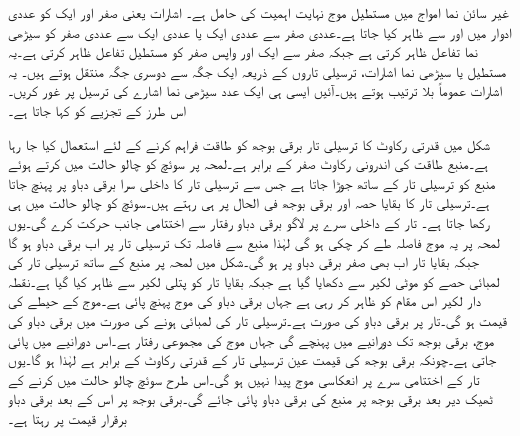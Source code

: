 غیر سائن نما امواج میں مستطیل موج نہایت اہمیت کی حامل ہے۔ اشارات یعنی صفر اور  ایک  کو عددی ادوار  میں  اور  سے ظاہر کیا جاتا ہے۔عددی صفر سے عددی ایک یا عددی ایک سے عددی صفر کو سیڑھی نما تفاعل ظاہر کرتی ہے جبکہ صفر سے ایک اور واپس صفر کو مستطیل تفاعل ظاہر کرتی ہے۔یہ مستطیل یا سیڑھی نما اشارات، ترسیلی تاروں کے ذریعہ ایک جگہ سے دوسری جگہ منتقل ہوتے ہیں۔ یہ اشارات عموماً بلا ترتیب ہوتے ہیں۔آئیں ایسی ہی ایک عدد سیڑھی نما اشارے کی ترسیل پر غور کریں۔ اس طرز کے تجزیے کو  کہا جاتا ہے۔

 شکل  میں  قدرتی رکاوٹ کا ترسیلی تار  برقی بوجھ کو طاقت فراہم کرنے کے لئے استعمال کیا جا رہا ہے۔منبع طاقت کی اندرونی رکاوٹ صفر کے برابر ہے۔لمحہ  پر سوئچ کو چالو حالت میں کرتے ہوئے منبع کو ترسیلی تار کے ساتھ جوڑا جاتا ہے جس سے ترسیلی تار کا داخلی سرا  برقی دباو پر پہنچ جاتا ہے۔ترسیلی تار کا بقایا حصہ اور برقی بوجھ فی الحال  پر ہی رہتے ہیں۔سوئچ کو چالو حالت میں ہی رکھا جاتا ہے۔ تار کے داخلی سرے پر لاگو برقی دباو رفتار  سے اختتامی جانب حرکت کرے گی۔یوں لمحہ  پر یہ موج  فاصلہ طے کر چکی ہو گی لہٰذا منبع سے فاصلہ  تک ترسیلی تار پر اب برقی دباو  ہو گا جبکہ بقایا تار اب بھی صفر برقی دباو پر ہو گی۔شکل  میں لمحہ  پر منبع کے ساتھ ترسیلی تار کی  لمبائی حصے کو موٹی لکیر سے دکھایا گیا ہے جبکہ بقایا تار کو پتلی لکیر سے ظاہر کیا گیا ہے۔نقطہ دار لکیر اس مقام کو ظاہر کر رہی ہے جہاں برقی دباو کی موج   پہنچ پائی ہے۔موج کے حیطے کی قیمت   ہو گی۔تار پر برقی دباو کی صورت  ہے۔ترسیلی تار کی لمبائی  ہونے کی صورت میں برقی دباو کی موج،  برقی بوجھ تک  دورانیے میں پہنچے گی جہاں  موج کی مجموعی رفتار ہے۔اس دورانیے میں  پائی جاتی ہے۔چونکہ برقی بوجھ کی قیمت عین ترسیلی تار کے قدرتی رکاوٹ کے  برابر ہے لہٰذا  ہو گا۔یوں تار کے اختتامی سرے پر انعکاسی موج پیدا نہیں ہو گی۔اس طرح سوئچ چالو حالت میں کرنے کے ٹھیک   دیر بعد برقی بوجھ پر منبع کی برقی دباو  پائی جائے گی۔برقی بوجھ پر اس کے بعد برقی دباو برقرار  قیمت پر رہتا ہے۔

